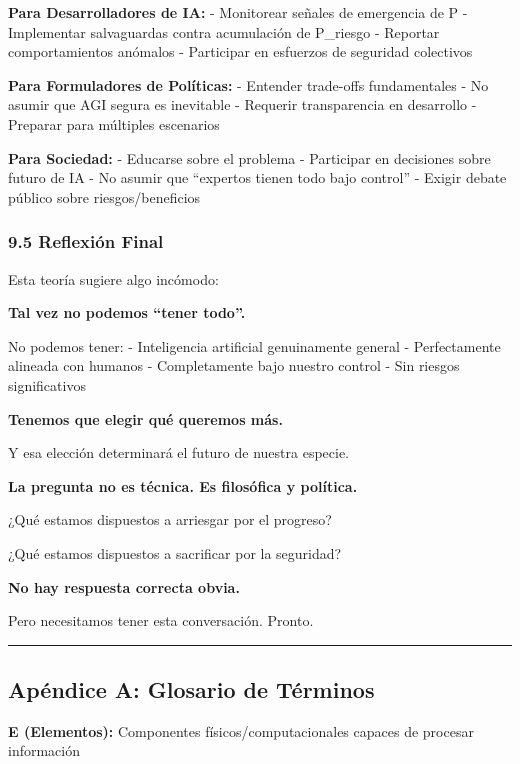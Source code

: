 \textbf{Para Desarrolladores de IA:} - Monitorear señales de emergencia
de P - Implementar salvaguardas contra acumulación de P\_riesgo -
Reportar comportamientos anómalos - Participar en esfuerzos de seguridad
colectivos

\textbf{Para Formuladores de Políticas:} - Entender trade-offs
fundamentales - No asumir que AGI segura es inevitable - Requerir
transparencia en desarrollo - Preparar para múltiples escenarios

\textbf{Para Sociedad:} - Educarse sobre el problema - Participar en
decisiones sobre futuro de IA - No asumir que ``expertos tienen todo
bajo control'' - Exigir debate público sobre riesgos/beneficios

\subsubsection{9.5 Reflexión Final}\label{reflexiuxf3n-final}

Esta teoría sugiere algo incómodo:

\textbf{Tal vez no podemos ``tener todo''.}

No podemos tener: - Inteligencia artificial genuinamente general -
Perfectamente alineada con humanos - Completamente bajo nuestro control
- Sin riesgos significativos

\textbf{Tenemos que elegir qué queremos más.}

Y esa elección determinará el futuro de nuestra especie.

\textbf{La pregunta no es técnica. Es filosófica y política.}

¿Qué estamos dispuestos a arriesgar por el progreso?

¿Qué estamos dispuestos a sacrificar por la seguridad?

\textbf{No hay respuesta correcta obvia.}

Pero necesitamos tener esta conversación. Pronto.

\begin{center}\rule{0.5\linewidth}{0.5pt}\end{center}

\subsection{Apéndice A: Glosario de
Términos}\label{apuxe9ndice-a-glosario-de-tuxe9rminos}

\textbf{E (Elementos):} Componentes físicos/computacionales capaces de
procesar información

